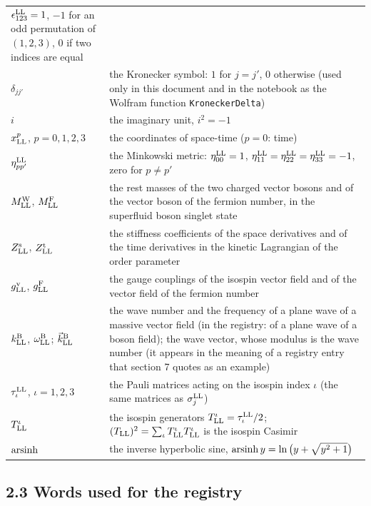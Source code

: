 \documentclass[
  10pt,
]{article}
\begin{document}
\begin{longtable}[]{@{}
  >{\raggedright\arraybackslash}p{}
  >{\raggedright\arraybackslash}p{}@{}}
\(\epsilon^{\rm LL}_{123}=1\), \(-1\) for an odd permutation of
\((1,2,3)\), \(0\) if two indices are equal \\
\(\delta_{jj'}\) & the Kronecker symbol: \(1\) for \(j=j'\), \(0\)
otherwise (used only in this document and in the notebook as the Wolfram
function \texttt{KroneckerDelta}) \\
\(i\) & the imaginary unit, \(i^2=-1\) \\
\(x^p_{\rm LL}\), \(p=0,1,2,3\) & the coordinates of space-time
(\(p=0\): time) \\
\(\eta^{\rm LL}_{pp'}\) & the Minkowski metric:
\(\eta^{\rm LL}_{00}=1\),
\(\eta^{\rm LL}_{11}=\eta^{\rm LL}_{22}=\eta^{\rm LL}_{33}=-1\), zero
for \(p\neq p'\) \\
\(M^{\rm W}_{\rm LL}\), \(M^{\rm F}_{\rm LL}\) & the rest masses of the
two charged vector bosons and of the vector boson of the fermion number,
in the superfluid boson singlet state \\
\(Z^{\rm s}_{\rm LL}\), \(Z^{\rm t}_{\rm LL}\) & the stiffness
coefficients of the space derivatives and of the time derivatives in the
kinetic Lagrangian of the order parameter \\
\(g^{\rm v}_{\rm LL}\), \(g^{\rm F}_{\rm LL}\) & the gauge couplings of
the isospin vector field and of the vector field of the fermion
number \\
\(k^{\rm B}_{\rm LL}\), \(\omega^{\rm B}_{\rm LL}\);
\(\vec k^{\rm B}_{\rm LL}\) & the wave number and the frequency of a
plane wave of a massive vector field (in the registry: of a plane wave
of a boson field); the wave vector, whose modulus is the wave number (it
appears in the meaning of a registry entry that section 7 quotes as an
example) \\
\(\tau^{\rm LL}_\iota\), \(\iota=1,2,3\) & the Pauli matrices acting on
the isospin index \(\iota\) (the same matrices as
\(\sigma^{\rm LL}_j\)) \\
\(T^\iota_{\rm LL}\) & the isospin generators
\(T^\iota_{\rm LL}=\tau^{\rm LL}_\iota/2\);
\((T_{\rm LL})^2=\sum_\iota T^\iota_{\rm LL}T^\iota_{\rm LL}\) is the
isospin Casimir \\
\({\rm arsinh}\) & the inverse hyperbolic sine,
\({\rm arsinh}\,y=\ln\big(y+\sqrt{y^2+1}\big)\) \\
\end{longtable}

\hypertarget{words-used-for-the-registry}{%
\subsection{2.3 Words used for the
registry}\label{words-used-for-the-registry}}
\end{document}
